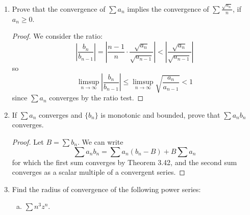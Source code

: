 \begin{enumerate}
\begin{enumerate}[(a)]
\item $a_n = \frac{\sqrt{n + 1} - \sqrt{n}}{n}$.

\begin{proof}
Manipulate:
\[
0 \le a_n = \frac{\sqrt{n + 1} - \sqrt{n}}{n} = \frac{(n + 1) - n}{n (\sqrt{n + 1} + \sqrt{n})} \le \frac{1}{n^{3/2}}
\]
so since $\sum n^{-3/2}$ converges, $\sum a_n$ converges by the comparison test.
\end{proof}

\item $a_n = \left(\sqrt[n]{n} - 1\right)^n$.

\begin{proof}
Since we have
\[
	\limsup_{n \to \infty} \sqrt[n]{a_n} = \limsup_{n \to \infty} \left(\sqrt[n]{n} - 1\right) = 0 < 1,
\]
the series $\sum a_n$ converges by the root test.
\end{proof}

\item $a_n = \frac{1}{1 + z^n}$ for complex $z$.

\begin{proof}
Notice that if $|z| < 1$, then $a_n \to 1 \ne 0$, so the sum does not converge. If $|z| > 1$, notice that the ratios
\[
	\left|\frac{a_n}{a_{n-1}}\right| = \left|\frac{1 + z^{n-1}}{1 + z^n}\right| \to \left|\frac{1}{z}\right| < 1
\]
so $\sum a_n$ converges by the ratio test. If $|z| = 1$, the sum diverges.
\end{proof}
\end{enumerate}

\item %
Prove that the convergence of $\sum a_n$ implies the convergence of $\sum \frac{\sqrt{a_n}}{n}$, if $a_n \ge 0$.

\begin{proof}
We consider the ratio:
\[
	\left| \frac{b_n}{b_{n-1}} \right| = \left| \frac{n-1}{n} \cdot \frac{\sqrt{a_n}}{\sqrt{a_{n-1}}} \right| < \left| \frac{\sqrt{a_n}}{\sqrt{a_{n-1}}} \right|
\]
so
\[
	\limsup_{n \to \infty} \left| \frac{b_n}{b_{n-1}} \right| \le \limsup_{n \to \infty} \sqrt{\frac{a_n}{a_{n-1}}} < 1
\]
since $\sum a_n$ converges by the ratio test.
\end{proof}

\item %
If $\sum a_n$ converges and $\{b_n\}$ is monotonic and bounded, prove that $\sum a_nb_n$ converges.

\begin{proof}
Let $B = \sum b_n$. We can write
\[
	\sum a_nb_n = \sum a_n(b_n - B) + B \sum a_n
\]
for which the first sum converges by Theorem 3.42, and the second sum converges as a scalar multiple of a convergent series.
\end{proof}
\item %
Find the radius of convergence of the following power series:
\begin{enumerate}[(a)]
\item $\sum n^3z^n$.


\end{enumerate}
\end{enumerate}
